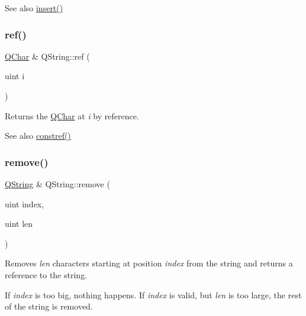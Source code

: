 \begin{DoxySeeAlso}{See also}
\mbox{\hyperlink{class_q_string_a3733066010481ab1e8f037bd99045269}{insert()}} 
\end{DoxySeeAlso}
\mbox{\label{class_q_string_aeed075cd66817a54e5a2d55ec0e68f4d}} 
\subsubsection{\texorpdfstring{ref()}{ref()}}
{\footnotesize\ttfamily \mbox{\hyperlink{class_q_char}{Q\+Char}} \& Q\+String\+::ref (\begin{DoxyParamCaption}\item[{uint}]{i }\end{DoxyParamCaption})\hspace{0.3cm}{\ttfamily [inline]}}

Returns the \mbox{\hyperlink{class_q_char}{Q\+Char}} at {\itshape i} by reference.

\begin{DoxySeeAlso}{See also}
\mbox{\hyperlink{class_q_string_a4eb0e1874ad0605cfdaee56eda991ed1}{constref()}} 
\end{DoxySeeAlso}
\mbox{\label{class_q_string_afd08aabf1d9b04a3fef298290af04cbd}} 
\subsubsection{\texorpdfstring{remove()}{remove()}}
{\footnotesize\ttfamily \mbox{\hyperlink{class_q_string}{Q\+String}} \& Q\+String\+::remove (\begin{DoxyParamCaption}\item[{uint}]{index,  }\item[{uint}]{len }\end{DoxyParamCaption})}

Removes {\itshape len} characters starting at position {\itshape index} from the string and returns a reference to the string.

If {\itshape index} is too big, nothing happens. If {\itshape index} is valid, but {\itshape len} is too large, the rest of the string is removed.


\begin{DoxyCode}{0}
\DoxyCodeLine{\textcolor{comment}{// s == "Meal"}}
\end{DoxyCode}


